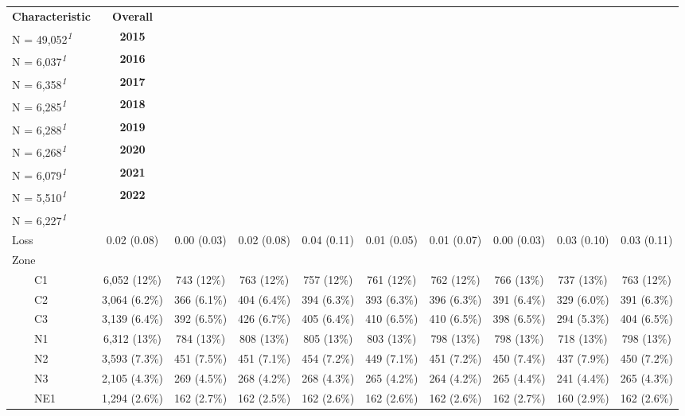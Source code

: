 \begingroup
\fontsize{12.0pt}{14.4pt}\selectfont
\setlength{\LTpost}{0mm}
\begin{longtable}{lccccccccc}
\toprule
\textbf{Characteristic} & \textbf{Overall}\\
N = 49,052\textsuperscript{\textit{1}} & \textbf{2015}\\
N = 6,037\textsuperscript{\textit{1}} & \textbf{2016}\\
N = 6,358\textsuperscript{\textit{1}} & \textbf{2017}\\
N = 6,285\textsuperscript{\textit{1}} & \textbf{2018}\\
N = 6,288\textsuperscript{\textit{1}} & \textbf{2019}\\
N = 6,268\textsuperscript{\textit{1}} & \textbf{2020}\\
N = 6,079\textsuperscript{\textit{1}} & \textbf{2021}\\
N = 5,510\textsuperscript{\textit{1}} & \textbf{2022}\\
N = 6,227\textsuperscript{\textit{1}} \\ 
\midrule\addlinespace[2.5pt]
Loss & 0.02 (0.08) & 0.00 (0.03) & 0.02 (0.08) & 0.04 (0.11) & 0.01 (0.05) & 0.01 (0.07) & 0.00 (0.03) & 0.03 (0.10) & 0.03 (0.11) \\ 
Zone &  &  &  &  &  &  &  &  &  \\ 
    C1 & 6,052 (12\%) & 743 (12\%) & 763 (12\%) & 757 (12\%) & 761 (12\%) & 762 (12\%) & 766 (13\%) & 737 (13\%) & 763 (12\%) \\ 
    C2 & 3,064 (6.2\%) & 366 (6.1\%) & 404 (6.4\%) & 394 (6.3\%) & 393 (6.3\%) & 396 (6.3\%) & 391 (6.4\%) & 329 (6.0\%) & 391 (6.3\%) \\ 
    C3 & 3,139 (6.4\%) & 392 (6.5\%) & 426 (6.7\%) & 405 (6.4\%) & 410 (6.5\%) & 410 (6.5\%) & 398 (6.5\%) & 294 (5.3\%) & 404 (6.5\%) \\ 
    N1 & 6,312 (13\%) & 784 (13\%) & 808 (13\%) & 805 (13\%) & 803 (13\%) & 798 (13\%) & 798 (13\%) & 718 (13\%) & 798 (13\%) \\ 
    N2 & 3,593 (7.3\%) & 451 (7.5\%) & 451 (7.1\%) & 454 (7.2\%) & 449 (7.1\%) & 451 (7.2\%) & 450 (7.4\%) & 437 (7.9\%) & 450 (7.2\%) \\ 
    N3 & 2,105 (4.3\%) & 269 (4.5\%) & 268 (4.2\%) & 268 (4.3\%) & 265 (4.2\%) & 264 (4.2\%) & 265 (4.4\%) & 241 (4.4\%) & 265 (4.3\%) \\ 
    NE1 & 1,294 (2.6\%) & 162 (2.7\%) & 162 (2.5\%) & 162 (2.6\%) & 162 (2.6\%) & 162 (2.6\%) & 162 (2.7\%) & 160 (2.9\%) & 162 (2.6\%) \\ 

\end{longtable}
